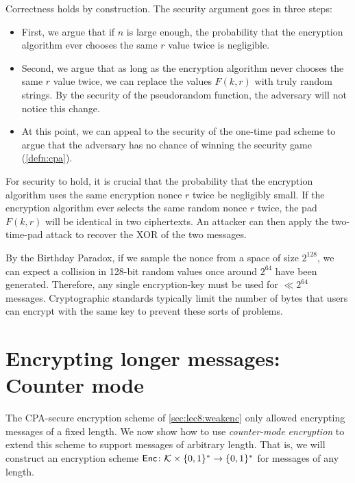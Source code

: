 Correctness holds by construction.
The security argument goes in three steps:
\begin{itemize}
  \item First, we argue that if $n$ is large enough, the probability 
        that the encryption algorithm ever chooses the same $r$ value twice
        is negligible.
  \item Second, we argue that as long as the encryption algorithm
        never chooses the same $r$ value twice, 
        we can replace the values $F(k, r)$ with truly random strings.
        By the security of the pseudorandom function, the adversary will
        not notice this change.
  \item At this point, we can appeal to the security of the one-time pad scheme
        to argue that the adversary has no chance of winning the security 
        game (\cref{defn:cpa}).
\end{itemize}

For security to hold, it is crucial that the probability 
that the encryption algorithm uses the same encryption nonce $r$ twice
be negligibly small.
If the encryption algorithm ever selects the
same random nonce $r$ twice, the pad $F(k, r)$ will be identical in 
two ciphertexts.
An attacker can then apply the two-time-pad attack to recover the XOR of the two messages.

By the Birthday Paradox, if we sample the nonce from a space of size $2^{128}$, we can expect a collision in 128-bit random values once around $2^{64}$ have been generated. Therefore, any single encryption-key must be used for $\ll 2^{64}$ messages.
Cryptographic standards typically limit the number of bytes that users can
encrypt with the same key to prevent these sorts of problems.


\section{Encrypting longer messages: Counter mode}
\label{sec:enc:ctr}

The CPA-secure encryption scheme of \cref{sec:lec8:weakenc} only
allowed encrypting messages of a fixed length.
We now show how to use \emph{counter-mode encryption} to extend
this scheme to support messages of arbitrary length.
That is, we will construct an encryption scheme 
$\mathsf{Enc} \colon \mathcal{K} \times \{0,1\}^* \to \{0,1\}^*$
for messages of any length.

